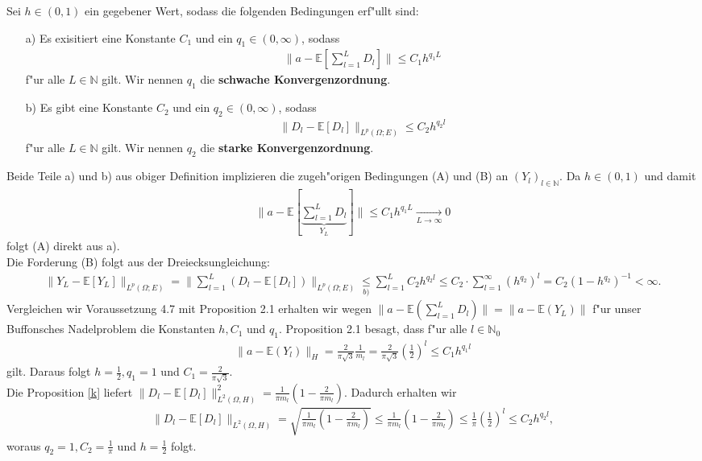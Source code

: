 \begin{vor}
Sei $h\in(0,1)$ ein gegebener Wert, sodass die folgenden Bedingungen erf"ullt sind:
\begin{enumerate}
\item[a)] Es exisitiert eine Konstante $C_1$ und ein $q_1\in (0,\infty)$, sodass
\begin{align*}
\Big\|a-\mathbb{E}\left[\sum_{l=1}^L D_l \right]\Big\|\leq C_1h^{q_1L}
\end{align*}
f"ur alle $L\in\mathbb{N}$ gilt. Wir nennen $q_1$ die \textbf{schwache Konvergenzordnung}.
\item[b)] Es gibt eine Konstante $C_2$ und ein $q_2\in(0,\infty)$, sodass
\begin{align*}
\|D_l-\mathbb{E}[D_l]\|_{L^p(\Omega;E)}\leq C_2h^{q_2 l}
\end{align*}
f"ur alle $L\in\mathbb{N}$ gilt. Wir nennen $q_2$ die \textbf{starke Konvergenzordnung}.
\end{enumerate}
\end{vor}
Beide Teile a) und b) aus obiger Definition implizieren die zugeh"origen Bedingungen (A) und (B) an $(Y_l)_{l\in\mathbb{N}}$.
Da $h\in(0,1)$  und damit
\begin{align*}
\Big\|a-\mathbb{E}[\underbrace{\sum_{l=1}^L D_l }_{Y_L}]\Big\|\leq C_1h^{q_1L}\underset{L\rightarrow \infty}{\longrightarrow} 0
\end{align*}
folgt (A) direkt aus a).\\
Die Forderung (B) folgt aus der Dreiecksungleichung:
\begin{align*}
\|Y_L-\mathbb{E}[Y_L]\|_{L^p(\Omega;E)}=\|\sum_{l=1}^L(D_l-\mathbb{E}[D_l])\|_{L^p(\Omega;E)}\underset{b)}{\leq}\sum_{l=1}^L C_2 h^{q_2 l}\leq C_2 \cdot \sum_{l=1}^\infty(h^{q_2})^l= C_2(1-h^{q_2})^{-1}<\infty.
\end{align*}
Vergleichen wir Voraussetzung 4.7 mit Proposition 2.1 erhalten wir wegen  $\|a-\mathbb{E}(\sum_{l=1}^L D_l)\|=\|a-\mathbb{E}(Y_L)\|$ f"ur unser Buffonsches Nadelproblem die Konstanten $h,C_1$ und $q_1$. Proposition 2.1 besagt, dass f"ur alle $l\in\mathbb{N}_0$ 
\begin{align*}
\|a-\mathbb{E}(Y_l)\|_H=\frac{2}{\pi\sqrt{3}}\frac{1}{m_l}=\frac{2}{\pi\sqrt{3}}\left(\frac{1}{2}\right)^l\leq C_1h^{q_1l}
\end{align*} gilt.
Daraus folgt $h=\frac{1}{2}, q_1=1$ und $C_1=\frac{2}{\pi\sqrt{3}}$.\\[0,2cm]
Die Proposition \eqref{k} liefert $\|D_l-\mathbb{E}[D_l]\|^2_{L^2(\Omega,H)}=\frac{1}{\pi m_l}\left(1-\frac{2}{\pi m_l}\right)$.
Dadurch erhalten wir
\begin{align*}
\|D_l-\mathbb{E}[D_l]\|_{L^2(\Omega,H)}=\sqrt{\frac{1}{\pi m_l}\left(1-\frac{2}{\pi m_l}\right)}\leq \frac{1}{\pi m_l}\left(1-\frac{2}{\pi m_l}\right) \leq \frac{1}{\pi}\left(\frac{1}{2}\right)^l\leq C_2h^{q_2l},
\end{align*}
woraus $ q_2=1, C_2=\frac{1}{\pi}$ und $h=\frac{1}{2}$ folgt.


